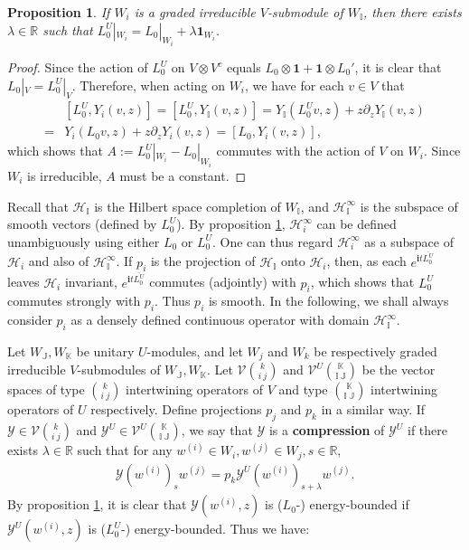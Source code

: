 \documentclass[11pt,b5paper,notitlepage]{article}
\theoremstyle{definition}
\theoremstyle{plain}
\newtheorem{pp}[df]{Proposition}
\newcommand{\mc}{\mathcal}
\newcommand{\ovl}{\overline}
\newcommand{\id}{\mathbf{1}}
\newcommand{\im}{\mathbf{i}}
\newcommand{\mbb}{\mathbb}
\numberwithin{equation}{subsection}
\begin{document}
\begin{pp}\label{lb76}
If $W_i$ is a graded irreducible $V$-submodule of $W_{\mbb I}$, then there exists $\lambda\in\mbb R$ such that $L_0^U|_{W_i}=L_0|_{W_i}+\lambda\id_{W_i}$.
\end{pp}
\begin{proof}
Since the action of $L_0^U$ on $V\otimes V^c$ equals $L_0\otimes \id+\id\otimes L_0'$, it is clear that $L_0|_V=L_0^U|_V$. Therefore, when acting on $W_i$, we have for each $v\in V$ that
\begin{align*}
&[L_0^U, Y_i(v,z)]=[L_0^U, Y_{\mbb I}(v,z)]=Y_{\mbb I}(L_0^Uv,z)+z\partial_zY_{\mbb I}(v,z)\\
=&Y_i(L_0v,z)+z\partial_zY_i(v,z)=[L_0,Y_i(v,z)],
\end{align*}
which shows that $A:=L_0^U|_{W_i}-L_0|_{W_i}$ commutes with the action of $V$ on $W_i$. Since $W_i$ is irreducible, $A$ must be a constant.
\end{proof}


Recall that $\mc H_{\mbb I}$ is the Hilbert space completion of $W_{\mbb I}$, and $\mc H^\infty_{\mbb I}$ is the subspace of smooth vectors (defined by $L_0^U$). By proposition \ref{lb76}, $\mc H_i^\infty$ can be defined unambiguously using either $L_0$ or $L_0^U$. One can thus regard $\mc H_i^\infty$ as a subspace of $\mc H_i$ and also of $\mc H_{\mbb I}^\infty$. If $p_i$ is the projection of $\mc H_{\mbb I}$ onto $\mc H_i$, then, as each $e^{\im t\ovl{L^U_0}}$ leaves $\mc H_i$ invariant, $e^{\im t\ovl{L^U_0}}$ commutes (adjointly) with $p_i$, which shows that $L^U_0$ commutes strongly with $p_i$. Thus $p_i$ is smooth. In the following, we shall always consider $p_i$ as a densely defined continuous operator with domain $\mc H_{\mbb I}^\infty$.


Let $W_{\mbb J},W_{\mbb K}$ be unitary $U$-modules, and let $W_j$ and $W_k$ be respectively graded irreducible $V$-submodules of $W_{\mbb J},W_{\mbb K}$. Let $\mc V{k\choose i~j}$ and $\mc V^U{\mbb K\choose \mbb I~\mbb J}$ be the vector spaces of type $k\choose i~j$ intertwining operators of $V$ and type $\mbb K\choose \mbb I~\mbb J$ intertwining operators of $U$ respectively. Define  projections $p_j$ and $p_k$ in a similar way. If $\mc Y\in\mc V{k\choose i~j}$ and $\mc Y^U\in\mc V^U{\mbb K\choose \mbb I~\mbb J}$, we say that $\mc Y$ is a \textbf{compression} of $\mc Y^U$ if there exists $\lambda\in\mbb R$ such that for any $w^{(i)}\in W_i,w^{(j)}\in W_j,s\in\mbb R$,
\begin{align}
\mc Y(w^{(i)})_sw^{(j)}=p_k\mc Y^U(w^{(i)})_{s+\lambda}w^{(j)}.\label{eq50}
\end{align}
By proposition \ref{lb76}, it is clear that $\mc Y(w^{(i)},z)$ is ($L_0$-) energy-bounded if $\mc Y^U(w^{(i)},z)$ is ($L_0^U$-) energy-bounded. Thus we have:
\end{document}
